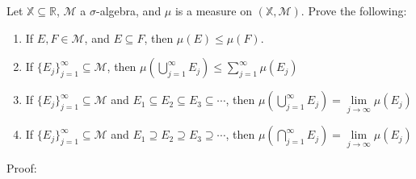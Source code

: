 \documentclass[12pt]{article}
\begin{document}
Let $\mathbb{X}\subseteq\mathbb{R}$, $\mathscr{M}$ a $\sigma$-algebra, and $\mu$ is a measure on $(\mathbb{X},\mathscr{M})$.  Prove the following:
\begin{enumerate}
\item If $E,F\in\mathscr{M}$, and $E\subseteq F$, then $\mu(E)\leq\mu(F)$.
\item If $\{E_j\}_{j=1}^\infty\subseteq\mathscr{M}$, then $\mu\left(\bigcup_{j=1}^\infty E_j\right)\leq\sum_{j=1}^\infty\mu(E_j)$
\item If $\{E_j\}_{j=1}^\infty\subseteq\mathscr{M}$ and $E_1\subseteq E_2\subseteq E_3\subseteq\cdots$, then $\mu\left(\bigcup \limits_{j=1}^\infty E_j\right)=\lim\limits_{j\rightarrow\infty}\mu(E_j)$
\item If $\{E_j\}_{j=1}^\infty\subseteq\mathscr{M}$ and $E_1\supseteq E_2\supseteq E_3\supseteq\cdots$, then $\mu\left(\bigcap \limits_{j=1}^\infty E_j\right)=\lim\limits_{j\rightarrow\infty}\mu(E_j)$
\end{enumerate}

Proof:
\end{document}

